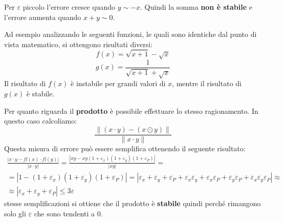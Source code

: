 Per $\varepsilon$ piccolo l'errore cresce quando $y \sim -x$. Quindi la somma
\textbf{non è stabile} e l'errore aumenta quando $x + y \sim 0$.
\begin{esempio}
    Ad esempio analizzando le seguenti funzioni, le quali sono identiche dal
    punto di vista matematico, si ottengono risultati diversi:
    \begin{equation*}
        f(x) = \sqrt{x + 1} - \sqrt{x}
    \end{equation*}
    \begin{equation*}
        g(x) = \frac{1}{\sqrt{x + 1} + \sqrt{x}}
    \end{equation*}
    Il risultato di $f(x)$ è instabile per grandi valori di $x$, mentre il
    risultato di $g(x)$ è stabile.
\end{esempio}
Per quanto riguarda il \textbf{prodotto} è possibile effettuare lo stesso
ragionamento. In questo caso calcoliamo:
\begin{equation}
    \frac{\|(x\cdot y)-(x\odot y)\|}{\|x\cdot y\|}
\end{equation}
Questa misura di errore può essere semplifica ottenendo il seguente risultato:
\begin{equation}
    \begin{aligned}
        \frac{|x \cdot y - fl(x) \cdot fl(y)|}{|x \cdot y|} = \frac{|xy - xy(1 +
        \varepsilon_x)(1 + \varepsilon_y)(1 + \varepsilon_P)|}{|xy|} = \\
        = |1 - (1 + \varepsilon_x)(1 + \varepsilon_y)(1 + \varepsilon_P)| =
        |\varepsilon_x + \varepsilon_y + \varepsilon_P + \varepsilon_x \varepsilon_y
        + \varepsilon_x \varepsilon_P + \varepsilon_y \varepsilon_P + \varepsilon_x
        \varepsilon_y \varepsilon_P| \approx                           \\
        \approx |\varepsilon_x + \varepsilon_y + \varepsilon_P| \leq 3\varepsilon
    \end{aligned}
\end{equation}
stesse semplificazioni si ottiene che il prodotto è \textbf{stabile} quindi perché
rimangono solo gli $\varepsilon$ che sono tendenti a $0$.
